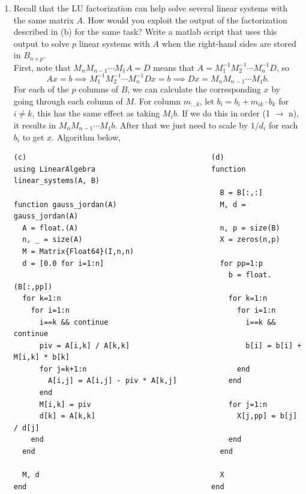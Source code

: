 \documentclass[11pt]{article}
\newcommand{\n}{\vspace{0.3cm}}
\begin{document}
\begin{enumerate}
\begin{enumerate}
		      \item Recall that the LU factorization can help solve several linear systems with the same matrix \(A\).  How would you exploit the output of the factorization described in (b) for the same task?  Write a matlab script that uses this output to solve \(p\) linear systems with \(A\) when the right-hand sides are stored in \(B_{n \times p}\). \n\\
		            First, note that \(M_n M_{n-1} \cdots M_1 A = D\) means that \(A = M_1^{-1}M_2^{-1} \cdots M_n^{-1} D\), so
		            \[Ax = b \implies M_1^{-1}M_2^{-1} \cdots M_n^{-1} Dx = b \implies Dx = M_n M_{n-1} \cdots M_1 b.\]
		            For each of the \(p\) columns of \(B\), we can calculate the corresponding \(x\) by going through each column of \(M\).  For column \(m_{:,k}\), let \(b_i = b_i + m_{ik} \cdot b_k\) for \(i \neq k\), this has the same effect as taking \(M_i b\).  If we do this in order (1 \(\to\) n), it results in \(M_n M_{n-1} \cdots M_1 b\).  After that we just need to scale by \(1/d_i\) for each \(b_i\) to get \(x\).  Algorithm below,

		            \begin{verbatim}
(c)                                           (d)
using LinearAlgebra                           function linear_systems(A, B)
                                                B = B[:,:]
function gauss_jordan(A)                        M, d = gauss_jordan(A)
  A = float.(A)                                 n, p = size(B)
  n, _ = size(A)                                X = zeros(n,p)
  M = Matrix{Float64}(I,n,n)                
  d = [0.0 for i=1:n]                           for pp=1:p 
                                                  b = float.(B[:,pp])
  for k=1:n                                       for k=1:n 
    for i=1:n                                       for i=1:n 
      i==k && continue                                i==k && continue
      piv = A[i,k] / A[k,k]                           b[i] = b[i] + M[i,k] * b[k]
      for j=k+1:n                                   end
        A[i,j] = A[i,j] - piv * A[k,j]            end
      end                                   
      M[i,k] = piv                                for j=1:n
      d[k] = A[k,k]                                 X[j,pp] = b[j] / d[j]
    end                                           end
  end                                           end
                                            
  M, d                                          X
end                                           end
		            \end{verbatim}


\end{enumerate}
\end{enumerate}
\end{document}

